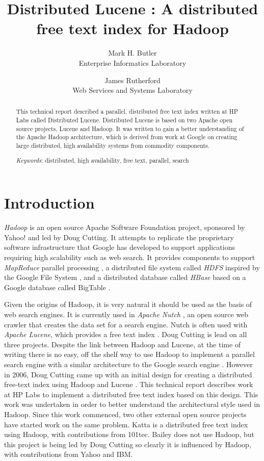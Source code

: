 \documentclass[a4paper,10pt]{article}
\title{Distributed Lucene : A distributed free text index for Hadoop}
\author{Mark H. Butler\\ \small Enterprise Informatics Laboratory \and James Rutherford \\ \small Web Services and Systems Laboratory}
\newcommand{\Keywords}[1]{\par\addvspace\baselineskip\noindent
{\small{\em Keywords\/}: #1}}
\begin{document}
\maketitle

\begin{abstract}
This technical report described a parallel, distributed free text index written at HP Labs called Distributed Lucene. Distributed Lucene is based on two Apache open source projects, Lucene and Hadoop. It was written to gain a better understanding of the Apache Hadoop architecture, which is derived from work at Google on creating large distributed, high availability systems from commodity components. 
\Keywords{distributed, high availability, free text, parallel, search}
\end{abstract}

\section{Introduction}
\emph{Hadoop} is an open source Apache Software Foundation project, sponsored by Yahoo!\cite{hadoop} and led by Doug Cutting. It attempts to replicate the proprietary software infrastructure that Google has developed to support applications requiring high scalability such as web search. It provides components to support \emph{MapReduce} parallel processing \cite{citeulike:430834}, a distributed file system called \emph{HDFS} inspired by the Google File System \cite{citeulike:300020}, and a distributed database called \emph{HBase} based on a Google database called BigTable \cite{citeulike:2259592}. 

Given the origins of Hadoop, it is very natural it should be used as the basis of web search engines. It is currently used in \emph{Apache Nutch} \cite{nutch}, an open source web crawler that creates the data set for a search engine. Nutch is often used with \emph{Apache Lucene}, which provides a free text index \cite{lucene}. Doug Cutting is lead on all three projects. Despite the link between Hadoop and Lucene, at the time of writing there is no easy, off the shelf way to use Hadoop to implement a parallel search engine with a similar architecture to the Google search engine \cite{barroso2003}. However in 2006, Doug Cutting came up with an initial design for creating a distributed free-text index using Hadoop and Lucene \cite{cutting2006}. This technical report describes work at HP Labs to implement a distributed free text index based on this design. This work was undertaken in order to better understand the architectural style used in Hadoop. Since this work commenced, two other external open source projects have started work on the same problem. Katta \cite{katta} is a distributed free text index using Hadoop, with contributions from 101tec. Bailey \cite{bailey} does not use Hadoop, but this project is being led by Doug Cutting so clearly it is influenced by Hadoop, with contributions from Yahoo and IBM. 
\end{document}
